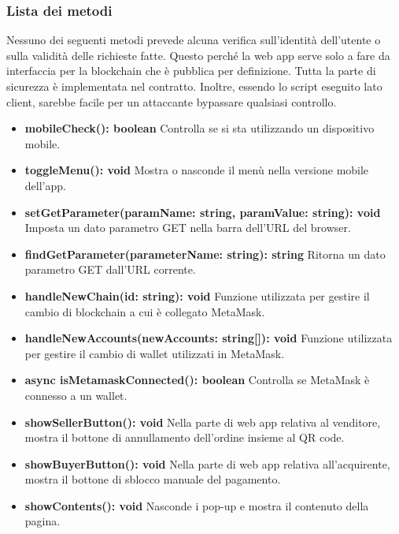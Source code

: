 \documentclass[a4paper, 12pt]{article}
\begin{document}
\subsubsection{Lista dei metodi}
Nessuno dei seguenti metodi prevede alcuna verifica sull'identità dell'utente o sulla validità delle richieste fatte. Questo perché la web app serve solo a fare da interfaccia per la blockchain che è pubblica per definizione. Tutta la parte di sicurezza è implementata nel contratto. Inoltre, essendo lo script eseguito lato client, sarebbe facile per un attaccante bypassare qualsiasi controllo.
\begin{itemize}
    \item \textbf{mobileCheck(): boolean} Controlla se si sta utilizzando un dispositivo mobile.\\
    \item \textbf{toggleMenu(): void} Mostra o nasconde il menù nella versione mobile dell'app.\\
    \item \textbf{setGetParameter(paramName: string, paramValue: string): void} Imposta un dato parametro GET nella barra dell'URL del browser.\\
    \item \textbf{findGetParameter(parameterName: string): string} Ritorna un dato parametro GET dall'URL corrente.\\
    \item \textbf{handleNewChain(id: string): void} Funzione utilizzata per gestire il cambio di blockchain a cui è collegato MetaMask.\\
    \item \textbf{handleNewAccounts(newAccounts: string[]): void} Funzione utilizzata per gestire il cambio di wallet utilizzati in MetaMask.\\
    \item \textbf{async isMetamaskConnected(): boolean} Controlla se MetaMask è connesso a un wallet.\\
    \item \textbf{showSellerButton(): void} Nella parte di web app relativa al venditore, mostra il bottone di annullamento dell'ordine insieme al QR code.\\
    \item \textbf{showBuyerButton(): void} Nella parte di web app relativa all'acquirente, mostra il bottone di sblocco manuale del pagamento.\\
    \item \textbf{showContents(): void} Nasconde i pop-up e mostra il contenuto della pagina.\\

\end{itemize}
\end{document}
